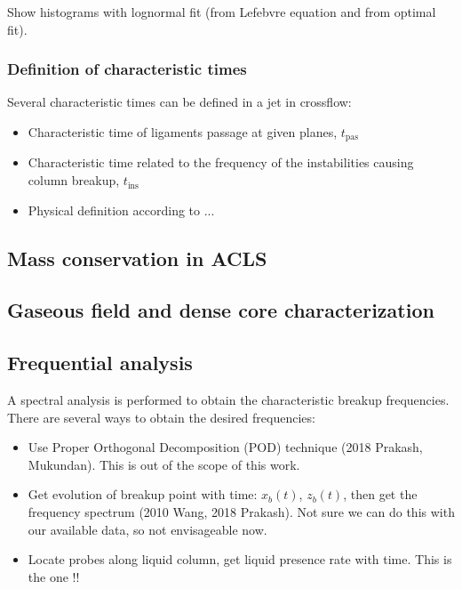 Show histograms with lognormal fit (from Lefebvre equation and from optimal fit).

\subsubsection{Definition of characteristic times}

Several characteristic times can be defined in a jet in crossflow:

\begin{itemize}

	\item Characteristic time of ligaments passage at given planes, $t_\mathrm{pas}$
	
	\item Characteristic time related to the frequency of the instabilities causing column breakup, $t_\mathrm{ins}$
	
	\item Physical definition according to ...

\end{itemize}


\subsection{Mass conservation in ACLS}

\subsection{Gaseous field and dense core characterization}
\label{subsec:ch5_dense_core_in_ACLS_simus}

\subsection{Frequential analysis}

A spectral analysis is performed to obtain the characteristic breakup frequencies. There are several ways to obtain the desired frequencies:

\begin{itemize}

	\item Use Proper Orthogonal Decomposition (POD) technique (2018 Prakash, Mukundan). This is out of the scope of this work.
	
	\item Get evolution of breakup point with time: $x_b \left( t \right)$, $z_b \left( t \right)$, then get the frequency spectrum  (2010 Wang, 2018 Prakash). Not sure we can do this with our available data, so not envisageable now.
	
	\item Locate probes along liquid column, get liquid presence rate with time. This is the one !!

\end{itemize}


